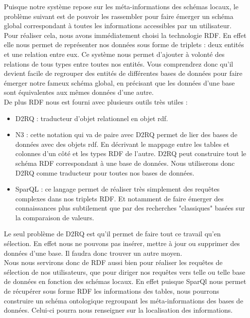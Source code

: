 \documentclass[12pt]{article}
\begin{document}
	Puisque notre système repose sur les méta-informations des schémas locaux, le problème suivant est de pouvoir les rassembler pour faire émerger un schéma global correspondant à toutes les informations accessibles par un utilisateur.\\
	Pour réaliser cela, nous avons immédiatement choisi la technologie RDF. En effet elle nous permet de représenter nos données sous forme de triplets : deux entités et une relation entre eux. Ce système nous permet d'ajouter à volonté des relations de tous types entre toutes nos entités. Vous comprendrez donc qu'il devient facile de regrouper des entités de différentes bases de données pour faire émerger notre fameux schéma global, en précisant que les données d'une base sont équivalentes aux mêmes données d'une autre.\\
	De plus RDF nous est fourni avec plusieurs outils très utiles :\\
	\begin{itemize}
		\item D2RQ : traducteur d'objet relationnel en objet rdf.
		\item N3 : cette notation qui va de paire avec D2RQ permet de lier des bases de données avec des objets rdf. En décrivant le mappage entre les tables et colonnes d'un côté et les types RDF de l'autre. D2RQ peut construire tout le schéma RDF correspondant à une base de données. Nous utiliserons donc D2RQ comme traducteur pour toutes nos bases de données.\\
		\item SparQL : ce langage permet de réaliser très simplement des requêtes complexes dans nos triplets RDF. Et notamment de faire émerger des connaissances plus subtilement que par des recherches "classiques" basées sur la comparaison de valeurs.\\
	\end{itemize}
	\indent Le seul problème de D2RQ est qu'il permet de faire tout ce travail qu'en sélection. En effet nous ne pouvons pas insérer, mettre à jour ou supprimer des données d'une base. Il faudra donc trouver un autre moyen.\\
	\indent Nous nous servirons donc de RDF aussi bien pour réaliser les requêtes de sélection de nos utilisateurs, que pour diriger nos requêtes vers telle ou telle base de données en fonction des schémas locaux. En effet puisque SparQl nous permet de récupérer sous forme RDF les informations des tables, nous pourrons construire un schéma ontologique regroupant les méta-informations des bases de données. Celui-ci pourra nous renseigner sur la localisation des informations.\\
\end{document}
